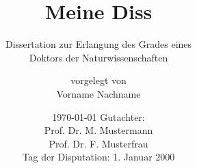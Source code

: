 %
%
%
\recalctypearea
%

%
%
\titlehead{
  \vspace{6em}
  \centering
  \texttt{[image: Uniol\_correctColor]}\\
  {%
    \lsstyle{}%
    \selectfont%
      fakultät ii -- informatik, wirtschafts- und rechtswissenschaften\\
      department für informatik%
  }
  \vspace{-4em}
}
%
\title{Meine Diss}
%
\subtitle{%
  \vspace{2em}%
  \normalfont%
  \textsf{%
    Dissertation zur Erlangung des Grades eines\\Doktors der Naturwissenschaften%
  }%
}
%
\author{{\large\textsf{vorgelegt von}}\\\textsf{Vorname Nachname}}              %
%
%
\date{\large\textsf{\today}}                                                    %
%
%
%
\date{%
  \vspace*{0.5em}%
  \large\textsf{%
    Gutachter:\\%
    Prof. Dr. M. Mustermann\\%
    Prof. Dr. F. Musterfrau\\[2em]%
    Tag der Disputation: 1. Januar 2000%
  }%
}
%
\maketitle
%

